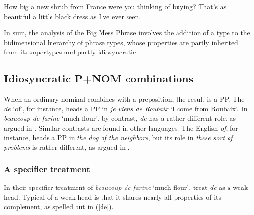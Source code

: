 \documentclass[output=paper
	        ,collection
	        ,collectionchapter
 	        ,biblatex
                ,babelshorthands
                ,newtxmath
                ,draftmode
                ,colorlinks, citecolor=brown
]{langscibook}
\begin{document}
\begin{exe} 
\ex\label{shrub} 
\begin{xlist} 
\ex  How big a new shrub from France were you thinking of buying? 
\ex  That's as beautiful a little black dress as I've ever seen.  
\end{xlist} 
\end{exe} 

In sum, the analysis of the Big Mess Phrase involves the addition of 
a type to the bidimensional hierarchy of phrase types, whose properties 
are partly inherited from its supertypes and partly idiosyncratic.      


\subsection{Idiosyncratic P+NOM combinations} 
\label{prep}


When an ordinary nominal combines with a preposition, the result is a PP. 
The  \emph{de} `of', for instance, heads a PP in 
\emph{je viens de Roubaix} `I come from Roubaix'. 
In \emph{beaucoup de farine} `much flour', by contrast, \emph{de} has 
a rather different role, as argued in \citet{Abeilleetal04}. 
Similar contrasts are found in other languages. The English \emph{of}, for instance, 
heads a PP in \emph{the dog of the neighbors}, but its role in \emph{these sort of problems} 
is rather different, as argued in \citet{Maekawa15}.  


\subsubsection{A specifier treatment} 


In their specifier treatment of \emph{beaucoup de farine} `much flour',  
\citet{Abeilleetal04} treat \emph{de} as a weak head. 
Typical of a weak head is that it shares 
nearly all properties of its complement, as spelled out in (\ref{de}).

\begin{exe} 
\ex\label{de} 
\end{exe} 
\end{document}
